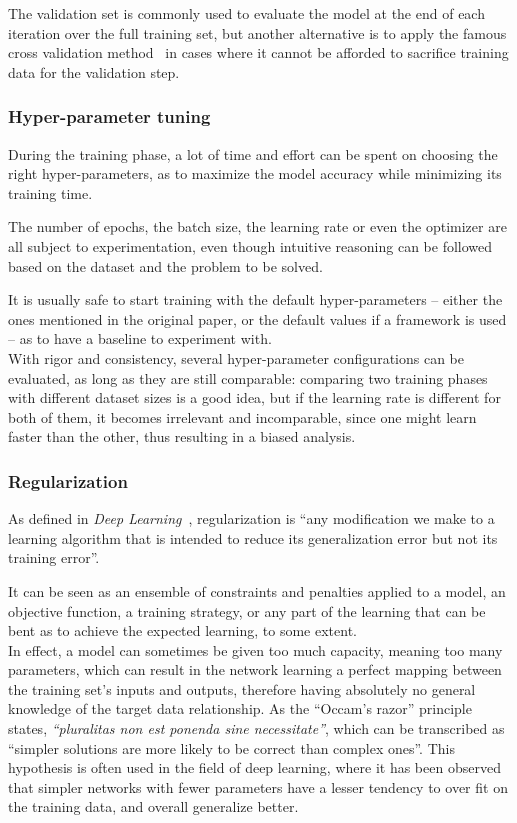 The validation set is commonly used to evaluate the model at the end of each
iteration over the full training set, but another alternative is to apply the
famous cross validation method~\cite{CrossVal} in cases where it cannot be
afforded to sacrifice training data for the validation step.

	\subsubsection{Hyper-parameter tuning}

During the training phase, a lot of time and effort can be spent on choosing
the right hyper-parameters, as to maximize the model accuracy while minimizing
its training time.

The number of epochs, the batch size, the learning rate or even the optimizer
are all subject to experimentation, even though intuitive reasoning can be
followed based on the dataset and the problem to be solved.

It is usually safe to start training with the default hyper-parameters -- either
the ones mentioned in the original paper, or the default values if a framework
is used -- as to have a baseline to experiment with.\\

With rigor and consistency, several hyper-parameter configurations can be
evaluated, as long as they are still comparable: comparing two training phases
with different dataset sizes is a good idea, but if the learning rate is
different for both of them, it becomes irrelevant and incomparable, since one
might learn faster than the other, thus resulting in a biased analysis.

	\subsubsection{Regularization}

As defined in \emph{Deep Learning}~\cite{Goodfellow-et-al-2016}, regularization
is ``any modification we make to a learning algorithm that is intended to
reduce its generalization error but not its training error''.

It can be seen as an ensemble of constraints and penalties applied to a model,
an objective function, a training strategy, or any part of the learning that
can be bent as to achieve the expected learning, to some extent.\\

In effect, a model can sometimes be given too much capacity, meaning too many
parameters, which can result in the network learning a perfect mapping between
the training set's inputs and outputs, therefore having absolutely no general
knowledge of the target data relationship. As the ``Occam's razor'' principle
states, \emph{``pluralitas non est ponenda sine necessitate''}, which can be
transcribed as ``simpler solutions are more likely to be correct than complex
ones''. This hypothesis is often used in the field of deep learning, where it
has been observed that simpler networks with fewer parameters have a lesser
tendency to over fit on the training data, and overall generalize better.\\

